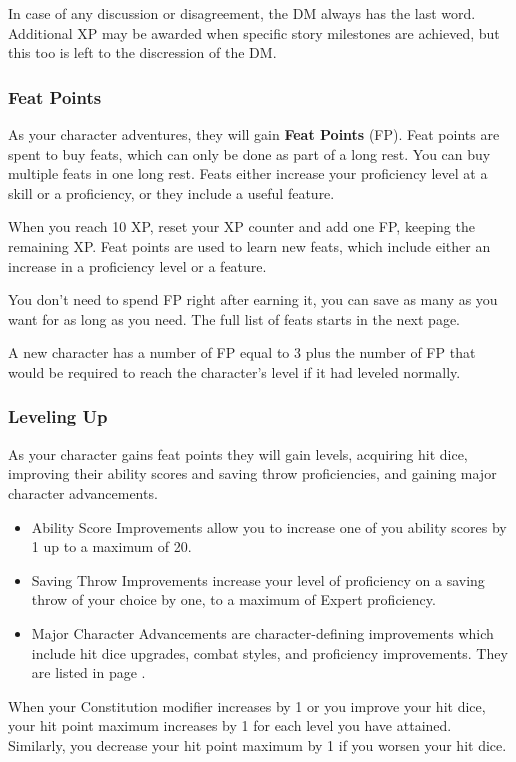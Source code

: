     In case of any discussion or disagreement, the DM always has the last word.
    Additional XP may be awarded when specific story milestones are achieved, but this too is left to the discression of the DM.

    \newpage

\subsubsection{Feat Points}
    As your character adventures, they will gain \textbf{Feat Points} (FP).
    Feat points are spent to buy feats, which can only be done as part of a long rest.
    You can buy multiple feats in one long rest.
    Feats either increase your proficiency level at a skill or a proficiency, or they include a useful feature.

    When you reach 10 XP, reset your XP counter and add one FP, keeping the remaining XP.
    Feat points are used to learn new feats, which include either an increase in a proficiency level or a feature.

    You don't need to spend FP right after earning it, you can save as many as you want for as long as you need.
    The full list of feats starts in the next page.

    A new character has a number of FP equal to 3 plus the number of FP that would be required to reach the character's level if it had leveled normally.

\subsubsection{Leveling Up}
    As your character gains feat points they will gain levels, acquiring hit dice, improving their ability scores and saving throw proficiencies, and gaining major character advancements.
    \begin{itemize}
        \item Ability Score Improvements allow you to increase one of you ability scores by 1 up to a maximum of 20.
        \item Saving Throw Improvements increase your level of proficiency on a saving throw of your choice by one, to a maximum of Expert proficiency.
        \item Major Character Advancements are character-defining improvements which include hit dice upgrades, combat styles, and proficiency improvements.
        They are listed in page \pageref{ssec::majorcharacteradvancement}.
    \end{itemize}

    When your Constitution modifier increases by 1 or you improve your hit dice, your hit point maximum increases by 1 for each level you have attained.
    Similarly, you decrease your hit point maximum by 1 if you worsen your hit dice.

    \newpage
